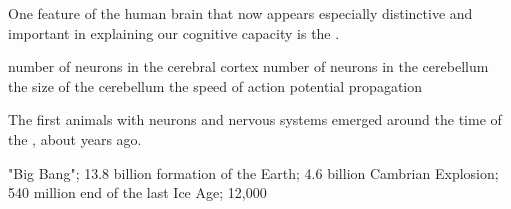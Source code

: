 \documentclass[answers]{exam}
\begin{document}
\begin{questions}

\question One feature of the human brain that now appears especially distinctive and important in explaining our cognitive capacity is the \fillin.
\begin{choices}
\correctchoice number of neurons in the cerebral cortex
\choice number of neurons in the cerebellum
\choice the size of the cerebellum
\choice the speed of action potential propagation
\end{choices}


\question The first animals with neurons and nervous systems emerged around the time of the \fillin, about \fillin years ago.
\begin{choices}
\choice "Big Bang"; 13.8 billion
\choice formation of the Earth; 4.6 billion
\correctchoice Cambrian Explosion; 540 million
\choice end of the last Ice Age; 12,000
\end{choices}

\newpage





\end{questions}
\end{document}
